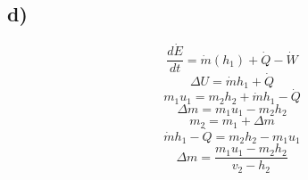 

\subsection*{d)}
\[
\frac{d\dot{E}}{dt} = \dot{m}(h_1) + \dot{Q} - \dot{W}
\]
\[
\Delta U = \dot{m} h_1 + \dot{Q}
\]
\[
m_1 u_1 = m_2 h_2 + \dot{m} h_1 - \dot{Q}
\]
\[
\Delta m = m_1 u_1 - m_2 h_2
\]
\[
m_2 = m_1 + \Delta m
\]
\[
\dot{m} h_1 - \dot{Q} = m_2 h_2 - m_1 u_1
\]
\[
\Delta m = \frac{m_1 u_1 - m_2 h_2}{v_2 - h_2}
\]